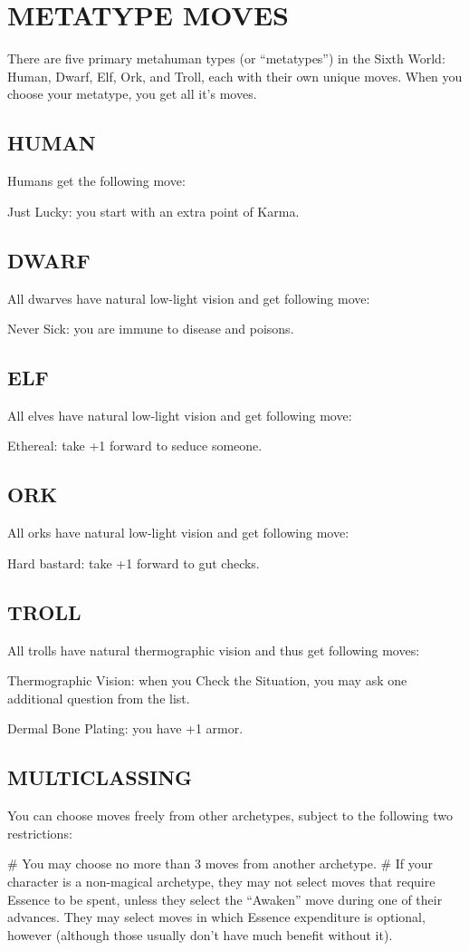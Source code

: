 \section{METATYPE MOVES}
There are five primary metahuman types (or “metatypes”) in the Sixth World: Human, Dwarf, Elf, Ork, and Troll, each with their own unique moves. When you choose your metatype, you get all it’s moves.

\subsection{HUMAN}
Humans get the following move:

Just Lucky: you start with an extra point of Karma.

\subsection{DWARF}
All dwarves have natural low-light vision and get following move:

Never Sick: you are immune to disease and poisons.

\subsection{ELF}
All elves have natural low-light vision and get following move:

Ethereal: take +1 forward to seduce someone.

\subsection{ORK}
All orks have natural low-light vision and get following move:

Hard bastard: take +1 forward to gut checks.

\subsection{TROLL}
All trolls have natural thermographic vision and thus get following moves:

Thermographic Vision: when you Check the Situation, you may ask one additional question from the list.

Dermal Bone Plating: you have +1 armor.

\subsection{MULTICLASSING}

You can choose moves freely from other archetypes, subject to the following two restrictions:

\begin{easylist}
# You may choose no more than 3 moves from another archetype.
# If your character is a non-magical archetype, they may not select moves that require Essence to be spent, unless they select the “Awaken” move during one of their advances. They may select moves in which Essence expenditure is optional, however (although those usually don’t have much benefit without it).
\end{easylist}
